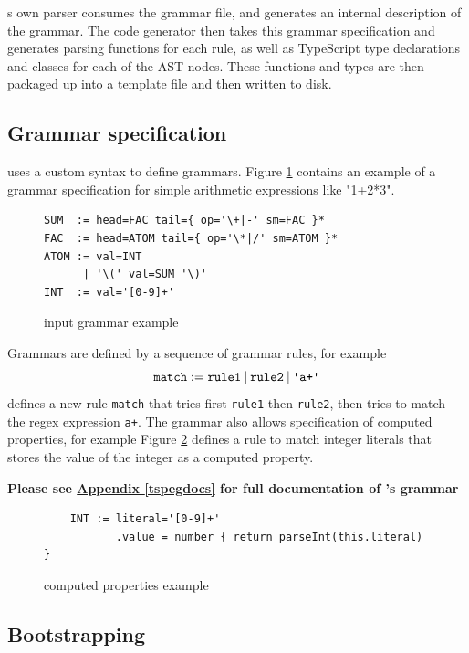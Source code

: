 \tsPEG{}s own parser consumes the grammar file, and generates an internal description of the grammar. The code generator then takes this grammar specification and generates parsing functions for each rule, as well as TypeScript type declarations and classes for each of the AST nodes. These functions and types are then packaged up into a template file and then written to disk.

\subsection{Grammar specification}

\tsPEG{} uses a custom syntax to define grammars. Figure \ref{tspegexample} contains an example of a grammar specification for simple arithmetic expressions like "1+2*3".

\begin{figure}
    \caption{\tsPEG{} input grammar example}
    \label{tspegexample}
    \begin{lstlisting}
SUM  := head=FAC tail={ op='\+|-' sm=FAC }*
FAC  := head=ATOM tail={ op='\*|/' sm=ATOM }*
ATOM := val=INT
      | '\(' val=SUM '\)'
INT  := val='[0-9]+'
    \end{lstlisting}
\end{figure}

Grammars are defined by a sequence of grammar rules, for example
    \[\texttt{match} := \texttt{rule1} \mathbin{|} \texttt{rule2} \mathbin{|} \texttt{\textquotesingle a+\textquotesingle}\]
    defines a new rule \verb|match| that tries first \verb|rule1| then \verb|rule2|, then tries to match the regex expression \verb|a+|.
    The \tsPEG{} grammar also allows specification of computed properties, for example Figure \ref{tspegcomputed} defines a rule to match integer literals that stores the value of the integer as a computed property.

   \textbf{Please see \hyperref[tspegdocs]{Appendix \ref*{tspegdocs}} for full documentation of \tsPEG{}'s grammar} 
\begin{figure}
    \caption{\tsPEG{} computed properties example}
    \label{tspegcomputed}
    \begin{lstlisting}
    INT := literal='[0-9]+'
           .value = number { return parseInt(this.literal) }
    \end{lstlisting}
\end{figure}

\subsection{Bootstrapping}

